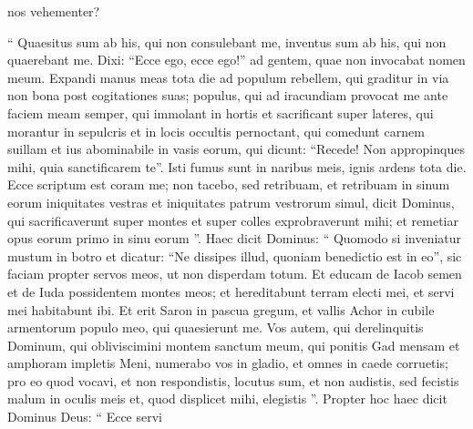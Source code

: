 \begin{biblechapter}
\begin{biblechapter}
\begin{biblechapter}
\begin{biblechapter}
\begin{biblechapter}
\begin{biblechapter}
\begin{biblechapter}
\begin{biblechapter}
\begin{biblechapter}
\begin{biblechapter}
\begin{biblechapter}
\begin{biblechapter}
\begin{biblechapter}
\begin{biblechapter}
\begin{biblechapter}
\begin{biblechapter}
\begin{biblechapter}
\begin{biblechapter}
\begin{biblechapter}
\begin{biblechapter}
\begin{biblechapter}
\begin{biblechapter}
\begin{biblechapter}
\begin{biblechapter}
\begin{biblechapter}
\begin{biblechapter}
\begin{biblechapter}
\begin{biblechapter}
\begin{biblechapter}
\begin{biblechapter}
\begin{biblechapter}
\begin{biblechapter}
\begin{biblechapter}
\begin{biblechapter}
\begin{biblechapter}
\begin{biblechapter}
\begin{biblechapter}
\begin{biblechapter}
\begin{biblechapter}
\begin{biblechapter}
\begin{biblechapter}
\begin{biblechapter}
\begin{biblechapter}
\begin{biblechapter}
\begin{biblechapter}
\begin{biblechapter}
\begin{biblechapter}
\begin{biblechapter}
\begin{biblechapter}
\begin{biblechapter}
\begin{biblechapter}
\begin{biblechapter}
\begin{biblechapter}
\begin{biblechapter}
\begin{biblechapter}
\begin{biblechapter}
\begin{biblechapter}
\begin{biblechapter}
\begin{biblechapter}
\begin{biblechapter}
\begin{biblechapter}
\begin{biblechapter}
\begin{biblechapter}
\begin{biblechapter}
nos vehementer?
 
\begin{biblechapter}
\verse “ Quaesitus sum ab his, qui non consulebant me,
 inventus sum ab his, qui non quaerebant me.
 Dixi: “Ecce ego, ecce ego!”
 ad gentem, quae non invocabat nomen meum.
 \verse Expandi manus meas tota die
 ad populum rebellem,
 qui graditur in via non bona
 post cogitationes suas;
 \verse populus, qui ad iracundiam provocat me
 ante faciem meam semper,
 qui immolant in hortis
 et sacrificant super lateres,
 \verse qui morantur in sepulcris
 et in locis occultis pernoctant,
 qui comedunt carnem suillam
 et ius abominabile in vasis eorum,
 \verse qui dicunt: “Recede!
 Non appropinques mihi, quia sanctificarem te”.
 Isti fumus sunt in naribus meis,
 ignis ardens tota die.
 \verse Ecce scriptum est coram me;
 non tacebo, sed retribuam,
 et retribuam in sinum eorum
 \verse iniquitates vestras et iniquitates patrum vestrorum
 simul, dicit Dominus,
 qui sacrificaverunt super montes
 et super colles exprobraverunt mihi;
 et remetiar opus eorum primo
 in sinu eorum ”.
 \verse Haec dicit Dominus:
 “ Quomodo si inveniatur mustum in botro
 et dicatur: “Ne dissipes illud,
 quoniam benedictio est in eo”,
 sic faciam propter servos meos,
 ut non disperdam totum.
 \verse Et educam de Iacob semen
 et de Iuda possidentem montes meos;
 et hereditabunt terram electi mei,
 et servi mei habitabunt ibi.
 \verse Et erit Saron in pascua gregum,
 et vallis Achor in cubile armentorum
 populo meo, qui quaesierunt me.
 \verse Vos autem, qui derelinquitis Dominum,
 qui obliviscimini montem sanctum meum,
 qui ponitis Gad mensam
 et amphoram impletis Meni,
 \verse numerabo vos in gladio,
 et omnes in caede corruetis;
 pro eo quod vocavi, et non respondistis,
 locutus sum, et non audistis,
 sed fecistis malum in oculis meis
 et, quod displicet mihi, elegistis ”.
 \verse Propter hoc haec dicit Dominus Deus:
 “ Ecce servi 
\end{biblechapter}
\end{biblechapter}
\end{biblechapter}
\end{biblechapter}
\end{biblechapter}
\end{biblechapter}
\end{biblechapter}
\end{biblechapter}
\end{biblechapter}
\end{biblechapter}
\end{biblechapter}
\end{biblechapter}
\end{biblechapter}
\end{biblechapter}
\end{biblechapter}
\end{biblechapter}
\end{biblechapter}
\end{biblechapter}
\end{biblechapter}
\end{biblechapter}
\end{biblechapter}
\end{biblechapter}
\end{biblechapter}
\end{biblechapter}
\end{biblechapter}
\end{biblechapter}
\end{biblechapter}
\end{biblechapter}
\end{biblechapter}
\end{biblechapter}
\end{biblechapter}
\end{biblechapter}
\end{biblechapter}
\end{biblechapter}
\end{biblechapter}
\end{biblechapter}
\end{biblechapter}
\end{biblechapter}
\end{biblechapter}
\end{biblechapter}
\end{biblechapter}
\end{biblechapter}
\end{biblechapter}
\end{biblechapter}
\end{biblechapter}
\end{biblechapter}
\end{biblechapter}
\end{biblechapter}
\end{biblechapter}
\end{biblechapter}
\end{biblechapter}
\end{biblechapter}
\end{biblechapter}
\end{biblechapter}
\end{biblechapter}
\end{biblechapter}
\end{biblechapter}
\end{biblechapter}
\end{biblechapter}
\end{biblechapter}
\end{biblechapter}
\end{biblechapter}
\end{biblechapter}
\end{biblechapter}
\end{biblechapter}
